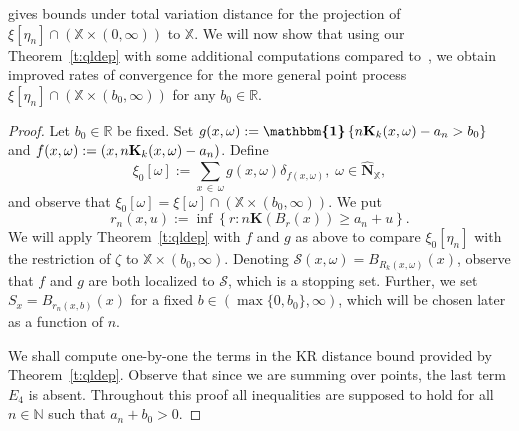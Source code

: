 \documentclass[AHL,Unicode,longabstracts]{cedram}
\newcommand*\bN{\mathbf{N}}
\newcommand*\bK{\mathbf{K}}
\newcommand*\N{\mathbb{N}}
\newcommand*\R{\mathbb{R}}
\newcommand*\X{\mathbb{X}}
\newcommand*\cS{\mathcal{S}}
\newcommand{\ind}{\boldsymbol{\mathbbm{1}}}
\newcommand{\set}[1]{\left\{#1\right\}}
\begin{document}
\cite[Theorem~4.2]{Otto2020} gives bounds under total variation distance for the projection of $\xi[\eta_n] \cap (\X \times (0,\infty))$ to $\X$. We will now show that using our Theorem~\ref{t:qldep} with some additional computations compared to~\cite[Theorem~4.2]{Otto2020}, we obtain improved rates of convergence for the more general point process $\xi[\eta_n] \cap (\X \times (b_0,\infty))$ for any $b_0 \in \R$.


\begin{proof}
Let $b_0 \in \R$ be fixed. Set $g(x,\omega) := \ind\set{n\bK_k(x,\omega) - a_n > b_0}$ and $f(x,\omega)\linebreak := (x, n\bK_k(x,\omega) - a_n)$. Define
\[
\xi_0[\omega] := \sum_{x\,\in\,\omega} g(x,\omega)\delta_{f(x,\omega)}, \; \omega \in \widehat{\bN}_{\X},
\]
and observe that $\xi_0[\omega] = \xi[\omega] \cap (\X \times (b_0,\infty)).$ We put
\[
r_n(x,u) := \inf \left\{r : n\bK(B_r(x)) \geq a_n + u \right\}.
\]
We will apply Theorem~\ref{t:qldep} with $f$ and $g$ as above to compare {$\xi_0[\eta_n]$ with the restriction of $\zeta$ to $\X\times (b_0,\infty)$.} Denoting $\cS(x,\omega) = B_{R_k(x,\omega)}(x)$, observe that {$f$ and $g$ are both localized to $\cS$,} which is a stopping set. Further, we set $S_x = B_{r_n(x,b)}(x)$ for a fixed {$b\in(\max\{0,b_0\},\infty)$,} which will be chosen later as a function of $n$.

We shall compute one-by-one the terms in the KR distance bound provided by Theorem~\ref{t:qldep}. Observe that since we are summing over points, the last term $E_4$ is absent. Throughout this proof all inequalities are supposed to hold for all $n\in\N$ such that {$a_n+b_0>0$.}


\end{proof}
\end{document}
